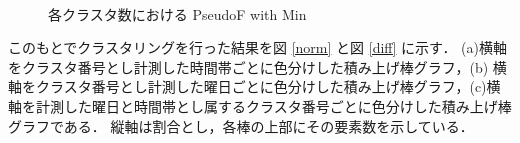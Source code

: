 \documentclass[technicalreport]{ieicej}
\begin{document}
\begin{figure}[tb]
\begin{center}
~
\caption{各クラスタ数における PseudoF with Min}
\label{PseudoFwithMinPlot}
\end{center}
\end{figure}

このもとでクラスタリングを行った結果を図 \ref{norm} と図 \ref{diff} に示す．
(a)横軸をクラスタ番号とし計測した時間帯ごとに色分けした積み上げ棒グラフ，(b) 横軸をクラスタ番号とし計測した曜日ごとに色分けした積み上げ棒グラフ，(c)横軸を計測した曜日と時間帯とし属するクラスタ番号ごとに色分けした積み上げ棒グラフである．
縦軸は割合とし，各棒の上部にその要素数を示している．
\end{document}
